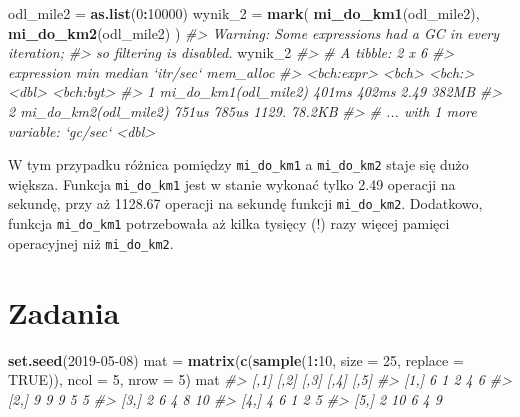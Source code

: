 \documentclass[paper=6in:9in,pagesize=pdftex,headinclude=on,footinclude=on,10pt]{scrbook}
\newenvironment{Shaded}{\begin{snugshade}}{\end{snugshade}}
\newcommand{\CommentTok}[1]{\textcolor[rgb]{0.56,0.35,0.01}{\textit{#1}}}
\newcommand{\DataTypeTok}[1]{\textcolor[rgb]{0.13,0.29,0.53}{#1}}
\newcommand{\DecValTok}[1]{\textcolor[rgb]{0.00,0.00,0.81}{#1}}
\newcommand{\KeywordTok}[1]{\textcolor[rgb]{0.13,0.29,0.53}{\textbf{#1}}}
\newcommand{\NormalTok}[1]{#1}
\newcommand{\OperatorTok}[1]{\textcolor[rgb]{0.81,0.36,0.00}{\textbf{#1}}}
\newcommand{\OtherTok}[1]{\textcolor[rgb]{0.56,0.35,0.01}{#1}}
\newcommand{\StringTok}[1]{\textcolor[rgb]{0.31,0.60,0.02}{#1}}
\begin{document}
\begin{Shaded}
\begin{Highlighting}[]
\NormalTok{odl_mile2 =}\StringTok{ }\KeywordTok{as.list}\NormalTok{(}\DecValTok{0}\OperatorTok{:}\DecValTok{10000}\NormalTok{)}
\NormalTok{wynik_}\DecValTok{2}\NormalTok{ =}\StringTok{ }\KeywordTok{mark}\NormalTok{(}
  \KeywordTok{mi_do_km1}\NormalTok{(odl_mile2),}
  \KeywordTok{mi_do_km2}\NormalTok{(odl_mile2)}
\NormalTok{)}
\CommentTok{#> Warning: Some expressions had a GC in every iteration;}
\CommentTok{#> so filtering is disabled.}
\NormalTok{wynik_}\DecValTok{2}
\CommentTok{#> # A tibble: 2 x 6}
\CommentTok{#>   expression             min median `itr/sec` mem_alloc}
\CommentTok{#>   <bch:expr>           <bch> <bch:>     <dbl> <bch:byt>}
\CommentTok{#> 1 mi_do_km1(odl_mile2) 401ms  402ms      2.49     382MB}
\CommentTok{#> 2 mi_do_km2(odl_mile2) 751us  785us   1129.      78.2KB}
\CommentTok{#> # ... with 1 more variable: `gc/sec` <dbl>}
\end{Highlighting}
\end{Shaded}

W tym przypadku różnica pomiędzy \texttt{mi\_do\_km1} a \texttt{mi\_do\_km2} staje się dużo większa.
Funkcja \texttt{mi\_do\_km1} jest w stanie wykonać tylko 2.49 operacji na sekundę, przy aż 1128.67 operacji na sekundę funkcji \texttt{mi\_do\_km2}.
Dodatkowo, funkcja \texttt{mi\_do\_km1} potrzebowała aż kilka tysięcy (!) razy więcej pamięci operacyjnej niż \texttt{mi\_do\_km2}.

\hypertarget{zadania-10}{%
\section{Zadania}\label{zadania-10}}

\begin{Shaded}
\begin{Highlighting}[]
\KeywordTok{set.seed}\NormalTok{(}\DecValTok{2019-05-08}\NormalTok{)}
\NormalTok{mat =}\StringTok{ }\KeywordTok{matrix}\NormalTok{(}\KeywordTok{c}\NormalTok{(}\KeywordTok{sample}\NormalTok{(}\DecValTok{1}\OperatorTok{:}\DecValTok{10}\NormalTok{, }\DataTypeTok{size =} \DecValTok{25}\NormalTok{, }\DataTypeTok{replace =} \OtherTok{TRUE}\NormalTok{)),}
             \DataTypeTok{ncol =} \DecValTok{5}\NormalTok{, }\DataTypeTok{nrow =} \DecValTok{5}\NormalTok{)}
\NormalTok{mat}
\CommentTok{#>      [,1] [,2] [,3] [,4] [,5]}
\CommentTok{#> [1,]    6    1    2    4    6}
\CommentTok{#> [2,]    9    9    9    5    5}
\CommentTok{#> [3,]    2    6    4    8   10}
\CommentTok{#> [4,]    4    6    1    2    5}
\CommentTok{#> [5,]    2   10    6    4    9}
\end{Highlighting}
\end{Shaded}
\end{document}
